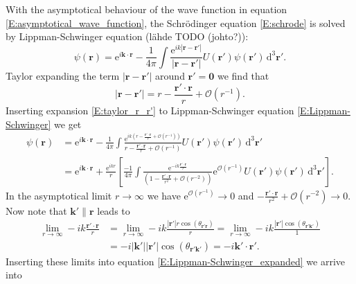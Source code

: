 \documentclass[a4paper, twoside, english, 12pt]{article}
\begin{document}
With the asymptotical behaviour of the wave function in equation \eqref{E:asymptotical_wave_function}, the Schrödinger equation \eqref{E:schrode} is solved by Lippman-Schwinger equation (lähde TODO (johto?)):
\begin{equation}\label{E:Lippman-Schwinger}
	\psi(\mathbf{r}) = \text{e}^{i\mathbf{k}\cdot\mathbf{r}} - \frac{1}{4\pi}\int \frac{\text{e}^{ik|\mathbf{r}-\mathbf{r'}|}}{|\mathbf{r}-\mathbf{r'}|}U(\mathbf{r'})\psi(\mathbf{r'})\,\text{d}^3\mathbf{r'}.
\end{equation}
Taylor expanding the term $|\mathbf{r}-\mathbf{r'}|$ around $\mathbf{r'}=\mathbf{0}$ we find that
\begin{equation}\label{E:taylor_r_r'}
	|\mathbf{r}-\mathbf{r'}|=r-\frac{\mathbf{r'}\cdot\mathbf{r}}{r}+\mathcal{O}(r^{-1}).
\end{equation}
Inserting expansion \eqref{E:taylor_r_r'} to Lippman-Schwinger equation \eqref{E:Lippman-Schwinger} we get
\begin{align}\label{E:Lippman-Schwinger_expanded}
	\psi(\mathbf{r}) &= \text{e}^{i\mathbf{k}\cdot\mathbf{r}} - \frac{1}{4\pi}\int \frac{\text{e}^{ik\left(r-\frac{\mathbf{r'}\cdot\mathbf{r}}{r}+\mathcal{O}(r^{-1})\right)}}{r-\frac{\mathbf{r'}\cdot\mathbf{r}}{r}+\mathcal{O}(r^{-1})}U(\mathbf{r'})\psi(\mathbf{r'})\,\text{d}^3\mathbf{r'} \nonumber \\
	&=\text{e}^{i\mathbf{k}\cdot\mathbf{r}} + \frac{\text{e}^{ikr}}{r}\left[\frac{-1}{4\pi}\int \frac{\text{e}^{-ik\frac{\mathbf{r'}\cdot\mathbf{r}}{r}}}{\left(1-\frac{\mathbf{r'}\cdot\mathbf{r}}{r^2}+\mathcal{O}(r^{-2})\right)}\text{e}^{\mathcal{O}(r^{-1})}U(\mathbf{r'})\psi(\mathbf{r'})\,\text{d}^3\mathbf{r'}\right].
\end{align}
In the asymptotical limit $r\rightarrow\infty$ we have $\text{e}^{\mathcal{O}(r^{-1})}\rightarrow 0$ and $-\frac{\mathbf{r'}\cdot\mathbf{r}}{r^2}+\mathcal{O}(r^{-2})\rightarrow 0$. Now note that $\mathbf{k'}\parallel\mathbf{r}$ leads to
\begin{align}
	\lim\limits_{r\rightarrow\infty} -ik\frac{\mathbf{r'}\cdot\mathbf{r}}{r} &= \lim\limits_{r\rightarrow\infty} -ik\frac{|\mathbf{r'}|r\cos(\theta_{\mathbf{r'}\mathbf{r}})}{r} = \lim\limits_{r\rightarrow\infty} -ik\frac{|\mathbf{r'}|\cos(\theta_{\mathbf{r'}\mathbf{k'}})}{1} \nonumber \\ 	
	&= -i|\mathbf{k'}||\mathbf{r'}|\cos(\theta_{\mathbf{r'}\mathbf{k'}}) = -i\mathbf{k'}\cdot\mathbf{r'} \nonumber.
\end{align}
Inserting these limits into equation \eqref{E:Lippman-Schwinger_expanded} we arrive into
\end{document}
